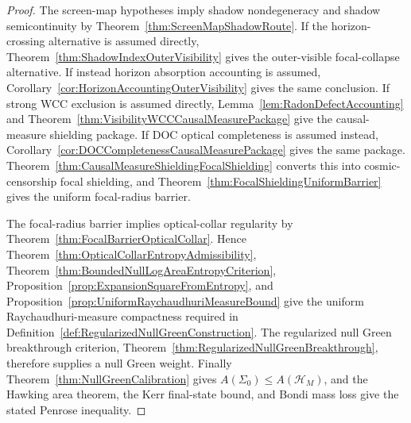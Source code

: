 \begin{proof}
The screen-map hypotheses imply shadow nondegeneracy and shadow semicontinuity by Theorem~\ref{thm:ScreenMapShadowRoute}. If the horizon-crossing alternative is assumed directly, Theorem~\ref{thm:ShadowIndexOuterVisibility} gives the outer-visible focal-collapse alternative. If instead horizon absorption accounting is assumed, Corollary~\ref{cor:HorizonAccountingOuterVisibility} gives the same conclusion. If strong WCC exclusion is assumed directly, Lemma~\ref{lem:RadonDefectAccounting} and Theorem~\ref{thm:VisibilityWCCCausalMeasurePackage} give the causal-measure shielding package. If DOC optical completeness is assumed instead, Corollary~\ref{cor:DOCCompletenessCausalMeasurePackage} gives the same package. Theorem~\ref{thm:CausalMeasureShieldingFocalShielding} converts this into cosmic-censorship focal shielding, and Theorem~\ref{thm:FocalShieldingUniformBarrier} gives the uniform focal-radius barrier.

The focal-radius barrier implies optical-collar regularity by Theorem~\ref{thm:FocalBarrierOpticalCollar}. Hence Theorem~\ref{thm:OpticalCollarEntropyAdmissibility}, Theorem~\ref{thm:BoundedNullLogAreaEntropyCriterion}, Proposition~\ref{prop:ExpansionSquareFromEntropy}, and Proposition~\ref{prop:UniformRaychaudhuriMeasureBound} give the uniform Raychaudhuri-measure compactness required in Definition~\ref{def:RegularizedNullGreenConstruction}. The regularized null Green breakthrough criterion, Theorem~\ref{thm:RegularizedNullGreenBreakthrough}, therefore supplies a null Green weight. Finally Theorem~\ref{thm:NullGreenCalibration} gives $A(\Sigma_0)\le A(\mathcal H_M)$, and the Hawking area theorem, the Kerr final-state bound, and Bondi mass loss give the stated Penrose inequality.
\end{proof}

